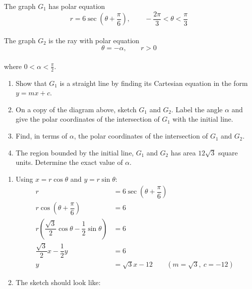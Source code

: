 \documentclass[leqno]{article}
\begin{document}
\begin{enumerate}[
  label=\textbf{\arabic*.},
  leftmargin=*,
  topsep=0pt,
  partopsep=0pt,
  parsep=0pt
]
The graph $G_1$ has polar equation
\[
r=6\sec\left(\theta+\frac{\pi}{6}\right),\qquad -\frac{2\pi}{3}<\theta<\frac{\pi}{3}
\] \\
The graph $G_2$ is the ray with polar equation
\[
\theta=-\alpha,\qquad r>0
\] \\
where $0<\alpha<\frac{\pi}{2}$. \\
\begin{enumerate}[label=\textbf{(\alph*)}]
\item Show that $G_1$ is a straight line by finding its Cartesian equation in the form $y=mx+c$.  \\
\item On a copy of the diagram above, sketch $G_1$ and $G_2$. Label the angle $\alpha$ and give the polar coordinates of the intersection of $G_1$ with the initial line.  \\
\item Find, in terms of $\alpha$, the polar coordinates of the intersection of $G_1$ and $G_2$.  \\
\item The region bounded by the initial line, $G_1$ and $G_2$ has area $12\sqrt{3}$ square units. Determine the exact value of $\alpha$.  \\
\end{enumerate}

\vspace*{10pt}

\begin{djsSolution}
\begin{enumerate}[label=\textbf{(\alph*)}, start=1]
\item Using \(x=r\cos\theta\) and \(y=r\sin\theta\):
\begin{align*}
r&=6\sec\left(\theta+\dfrac{\pi}{6}\right)\\
r\cos\left(\theta+\dfrac{\pi}{6}\right)&=6\\
r\left(\dfrac{\sqrt3}{2}\cos\theta-\dfrac12\sin\theta\right)&=6\\
\dfrac{\sqrt3}{2}x-\dfrac12y&=6\\
y&=\sqrt3x-12\qquad(m=\sqrt3,\ c=-12)
\end{align*}

\item The sketch should look like:\par\nopagebreak


\end{enumerate}
\end{djsSolution}
\end{enumerate}
\end{document}
